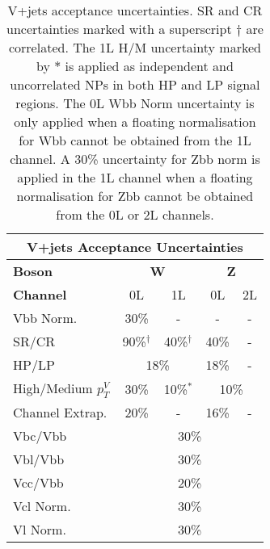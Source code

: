 \begin{table}[!htbp] 
  \footnotesize\centering
  \setlength{\tabcolsep}{0.5em} %
  \def\arraystretch{1.4} 
  \begin{tabular}{l|c|c|c|c}
      \hline\hline
      \multicolumn{5}{c}{V+jets Acceptance Uncertainties}            
      \\ \hline\hline
      \textbf{Boson}      & \multicolumn{2}{c|}{\textbf{W}} & \multicolumn{2}{c}{\textbf{Z}} 
      \\ \hline
      \textbf{Channel}    & 0L          & 1L         & 0L         & 2L          
      \\ \hline\hline
      Vbb Norm.           &   30\%      &     -      &     -      &          -  
      \\ \hline
      SR/CR               &   90\%$^\dagger$         & 40\%$^\dagger$ &      40\%     & -         
      \\ \hline
      HP/LP               & \multicolumn{2}{c|}{18\%}             &   18\%      & -         
      \\ \hline
      High/Medium $p_T^V$ &   30\%      & 10\%$^*$       & \multicolumn{2}{c}{10\%}          
      \\ \hline
      Channel Extrap.             &   20\%      &   -        &    16\%    & -
      \\ \hline
      Vbc/Vbb             & \multicolumn{4}{c}{30\%}                       
      \\ \hline
      Vbl/Vbb             & \multicolumn{4}{c}{30\%}                       
      \\ \hline
      Vcc/Vbb             & \multicolumn{4}{c}{20\%}                       
      \\ \hline
      Vcl Norm.           & \multicolumn{4}{c}{30\%}                       
      \\ \hline
      Vl Norm.            & \multicolumn{4}{c}{30\%}                       
      \\ \hline%
  \end{tabular}
  \caption{ V+jets acceptance uncertainties. \Wjets SR and CR uncertainties marked with a superscript $\dagger$ are correlated.
  The 1L \Wjets H/M uncertainty marked by $*$ is applied as independent and uncorrelated NPs in both HP and LP signal regions.
  The 0L \Wjets Wbb Norm uncertainty is only applied when a floating normalisation for Wbb cannot be obtained from the 1L channel.
  A 30\% uncertainty for Zbb norm is applied in the 1L channel when a floating normalisation for Zbb cannot be obtained from the 0L or 2L channels. }
  \label{tab:Vjets acceptance uncerts}
\end{table}
